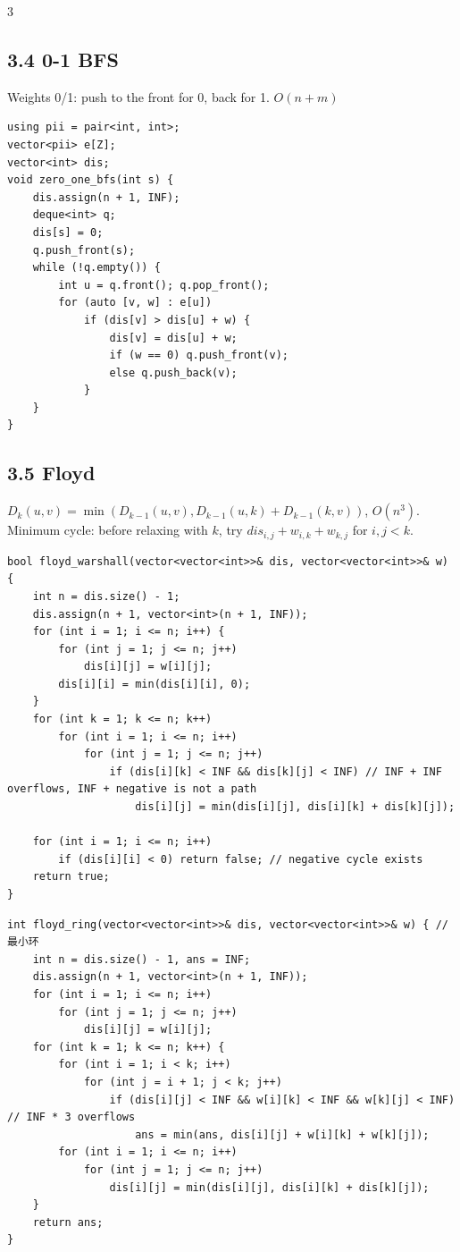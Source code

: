 \documentclass[8pt]{extarticle}
\begin{document}
\begin{multicols*}{3}
\subsection*{3.4 0-1 BFS}

Weights 0/1: push to the front for 0, back for 1. $O(n + m)$


\begin{lstlisting}
using pii = pair<int, int>;
vector<pii> e[Z];
vector<int> dis;
void zero_one_bfs(int s) {
    dis.assign(n + 1, INF);
    deque<int> q;
    dis[s] = 0;
    q.push_front(s);
    while (!q.empty()) {
        int u = q.front(); q.pop_front();
        for (auto [v, w] : e[u])
            if (dis[v] > dis[u] + w) {
                dis[v] = dis[u] + w;
                if (w == 0) q.push_front(v);
                else q.push_back(v);
            }
    }
}
\end{lstlisting}

\subsection*{3.5 Floyd}

$D_k(u, v) = \min(D_{k-1}(u, v), D_{k-1}(u, k) + D_{k-1}(k, v))$, $O(n^3)$. Minimum cycle: before relaxing with $k$, try $dis_{i,j} + w_{i,k} + w_{k,j}$ for $i, j < k$.


\begin{lstlisting}
bool floyd_warshall(vector<vector<int>>& dis, vector<vector<int>>& w) {
    int n = dis.size() - 1;
    dis.assign(n + 1, vector<int>(n + 1, INF));
    for (int i = 1; i <= n; i++) {
        for (int j = 1; j <= n; j++)
            dis[i][j] = w[i][j];
        dis[i][i] = min(dis[i][i], 0);
    }
    for (int k = 1; k <= n; k++)
        for (int i = 1; i <= n; i++)
            for (int j = 1; j <= n; j++)
                if (dis[i][k] < INF && dis[k][j] < INF) // INF + INF overflows, INF + negative is not a path
                    dis[i][j] = min(dis[i][j], dis[i][k] + dis[k][j]);
    
    for (int i = 1; i <= n; i++)
        if (dis[i][i] < 0) return false; // negative cycle exists
    return true;
}
\end{lstlisting}

\begin{lstlisting}
int floyd_ring(vector<vector<int>>& dis, vector<vector<int>>& w) { //最小环
    int n = dis.size() - 1, ans = INF;
    dis.assign(n + 1, vector<int>(n + 1, INF));
    for (int i = 1; i <= n; i++)
        for (int j = 1; j <= n; j++)
            dis[i][j] = w[i][j];
    for (int k = 1; k <= n; k++) {
        for (int i = 1; i < k; i++)
            for (int j = i + 1; j < k; j++)
                if (dis[i][j] < INF && w[i][k] < INF && w[k][j] < INF) // INF * 3 overflows
                    ans = min(ans, dis[i][j] + w[i][k] + w[k][j]);
        for (int i = 1; i <= n; i++)
            for (int j = 1; j <= n; j++)
                dis[i][j] = min(dis[i][j], dis[i][k] + dis[k][j]);
    }
    return ans;
}
\end{lstlisting}


\end{multicols*}
\end{document}
